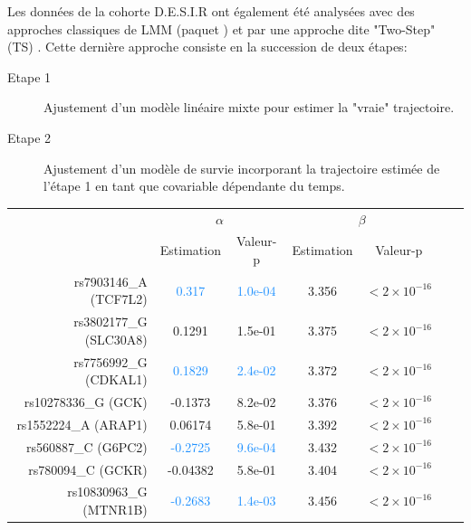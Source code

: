 \documentclass[11pt, a4paper]{article}
\begin{document}
\par{Les données de la cohorte D.E.S.I.R ont également été analysées avec des approches classiques de LMM
(paquet ) et par une approche dite "Two-Step" (TS) \citep{self_modeling_1992}.
Cette dernière approche consiste en la succession de deux étapes:
\begin{description}
    \item[Etape 1] Ajustement d'un modèle linéaire mixte pour estimer la "vraie" trajectoire.
    \item[Etape 2] Ajustement d'un modèle de survie incorporant la trajectoire estimée de l'étape 1
    en tant que covariable dépendante du temps.
\end{description}
\setlength{\tabcolsep}{5pt}
\begin{table}[ht]
    \begin{center}
        \begin{tabular}{rcccccc}
            \hline
            & \multicolumn{2}{c}{$\alpha$} & \multicolumn{2}{c}{$\beta$} \\
            & Estimation & Valeur-p & Estimation & Valeur-p \\
            \hline
            rs7903146\_A (TCF7L2) & \textcolor{dodgerblue}{0.317} & \textcolor{dodgerblue}{1.0e-04} & \textcolor{firebrick2}{3.356} & \textcolor{firebrick2}{$<2\times 10^{-16}$} \\
            rs3802177\_G (SLC30A8) & 0.1291 & 1.5e-01 & \textcolor{firebrick2}{3.375} & \textcolor{firebrick2}{$<2\times 10^{-16}$} \\
            rs7756992\_G (CDKAL1) & \textcolor{dodgerblue}{0.1829} & \textcolor{dodgerblue}{2.4e-02} & \textcolor{firebrick2}{3.372} & \textcolor{firebrick2}{$<2\times 10^{-16}$} \\
            rs10278336\_G (GCK) & -0.1373 & 8.2e-02 & \textcolor{firebrick2}{3.376} & \textcolor{firebrick2}{$<2\times 10^{-16}$} \\
            rs1552224\_A (ARAP1) & 0.06174 & 5.8e-01 & \textcolor{firebrick2}{3.392} & \textcolor{firebrick2}{$<2\times 10^{-16}$} \\
            rs560887\_C (G6PC2) & \textcolor{dodgerblue}{-0.2725} & \textcolor{dodgerblue}{9.6e-04} & \textcolor{firebrick2}{3.432} & \textcolor{firebrick2}{$<2\times 10^{-16}$} \\
            rs780094\_C (GCKR) & -0.04382 & 5.8e-01 & \textcolor{firebrick2}{3.404} & \textcolor{firebrick2}{$<2\times 10^{-16}$} \\
            rs10830963\_G (MTNR1B) & \textcolor{dodgerblue}{-0.2683} & \textcolor{dodgerblue}{1.4e-03} & \textcolor{firebrick2}{3.456} & \textcolor{firebrick2}{$<2\times 10^{-16}$} \\

\end{tabular}
\end{center}
\end{table}}
\end{document}
